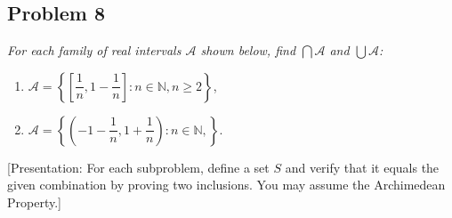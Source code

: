\documentclass{article}
\newcommand{\N}{{\mathbb N}}
\begin{document}
\subsection*{Problem 8}
{\it For each family of real intervals $\mathcal{A}$ shown below,
find $\bigcap \mathcal{A}$ and $\bigcup\mathcal{A}$:
\begin{enumerate}
	\item $\mathcal{A} = \left\{\left[\dfrac{1}{n}, 1 - \dfrac{1}{n}\right]
	\colon n \in \N, n \geq 2\right\}$,
	\item $\mathcal{A} = \left\{\left(-1-\dfrac{1}{n}, 1 + \dfrac{1}{n}\right)
	\colon n \in \N,\right\}$.
\end{enumerate}
[Presentation: For each subproblem, define a set $S$
and verify that it equals the given combination by proving two inclusions.
You may assume the Archimedean Property.]}
\end{document}
